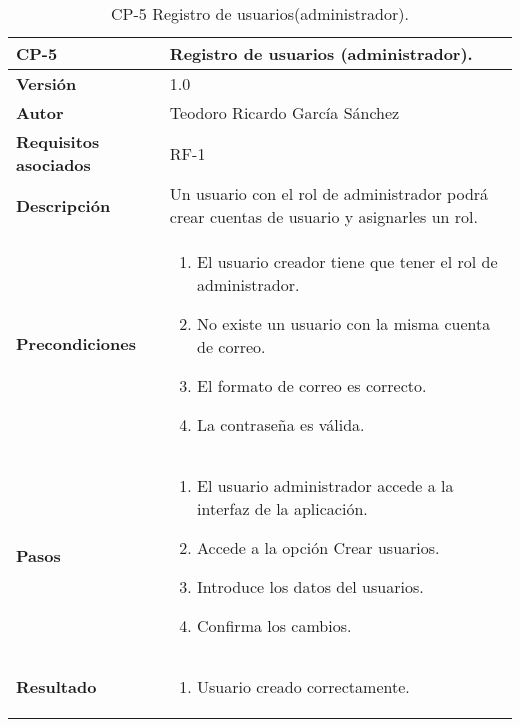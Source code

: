 \begin{table}[p]
	\centering
	\begin{tabularx}{\linewidth}{ p{} p{} }
		\toprule
		\textbf{CP-5}    & \textbf{Registro de usuarios (administrador).}\\
		\toprule
		\textbf{Versión}              & 1.0    \\
		\textbf{Autor}                & Teodoro Ricardo García Sánchez \\
		\textbf{Requisitos asociados} & RF-1 \\
		\textbf{Descripción}          & Un usuario con el rol de administrador podrá crear cuentas de usuario y asignarles un rol. \\
		\textbf{Precondiciones}         & 
		\begin{enumerate}
			\def\labelenumi{\arabic{enumi}.}
			\tightlist
			\item El usuario creador tiene que tener el rol de administrador.
			\item No existe un usuario con la misma cuenta de correo.
			\item El formato de correo es correcto.
			\item La contraseña es válida.
		\end{enumerate}\\
		\textbf{Pasos}             &
		\begin{enumerate}
			\def\labelenumi{\arabic{enumi}.}
			\tightlist
			\item El usuario administrador accede a la interfaz de la aplicación.
			\item Accede a la opción Crear usuarios.
			\item Introduce los datos del usuarios.
			\item Confirma los cambios.
		\end{enumerate}\\
		\textbf{Resultado}          & 
		\begin{enumerate}
			\item Usuario creado correctamente.
		\end{enumerate}\\
		\bottomrule
	\end{tabularx}
	\caption{CP-5 Registro de usuarios(administrador).}
\end{table}

